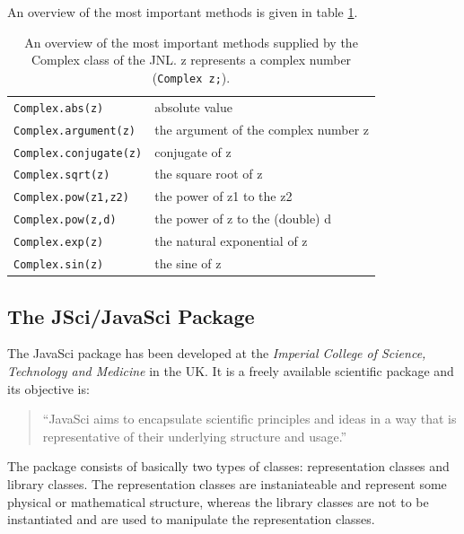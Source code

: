 An overview of the most important methods is given in table 
\ref{tab:JNLComplex}.
\begin{table}[htbp]
  \begin{center}
    \begin{tabular}{l|l}
      \verb|Complex.abs(z)| & absolute value \\
      \verb|Complex.argument(z)| & the argument of the complex number z \\
      \verb|Complex.conjugate(z)| & conjugate of z  \\
      \verb|Complex.sqrt(z)| & the square root of z \\
      \verb|Complex.pow(z1,z2)| & the power of z1 to the z2\\
      \verb|Complex.pow(z,d)| & the power of z to the (double) d\\
      \verb|Complex.exp(z)| & the natural exponential of z \\
      \verb|Complex.sin(z)| & the sine of z \\
    \end{tabular}
    \caption{An overview of the most important methods supplied by the 
      Complex class of the JNL. z represents a complex number 
      (\texttt{Complex z;}).}
    \label{tab:JNLComplex}
  \end{center}
\end{table}


\subsection{The JSci/JavaSci Package}
The JavaSci package has been developed at the
\emph{Imperial College of Science, Technology and Medicine} in the UK.
It is a freely available scientific package and its objective is:
\begin{quote}
``JavaSci aims to encapsulate scientific principles and ideas in a way 
that is representative of their underlying structure and usage.''
\end{quote}

The package consists of basically two types of classes: representation 
classes and library classes. The representation classes are instaniateable
and represent some physical or mathematical structure, whereas the
library classes are not to be instantiated and are used to manipulate
the representation classes.

